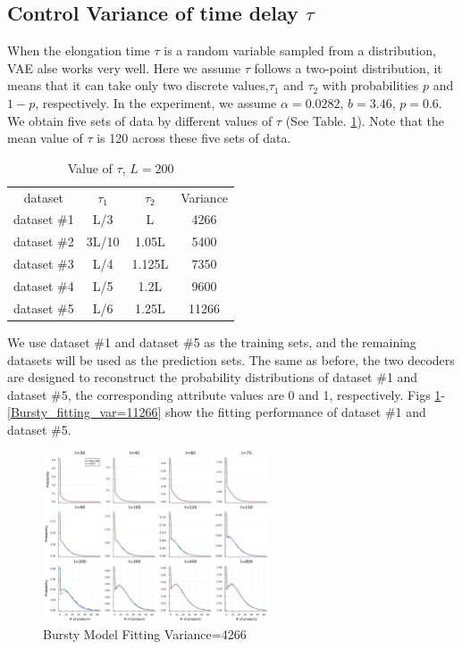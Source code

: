 \documentclass[a4paper,10pt]{article}
\begin{document}
\subsection{Control Variance of time delay $\tau$}
When the elongation time $\tau$ is a random variable sampled from a distribution, VAE alse works very well. Here we assume $\tau$ follows a two-point distribution, it means that it can take only two discrete values,$\tau_1$ and $\tau_2$ with probabilities $p$ and $1-p$, respectively. In the experiment, we assume $\alpha=0.0282$, $b=3.46$, $p=0.6$. We obtain five sets of data by different values of $\tau$ (See Table. \ref{table of tau}). Note that the mean value of $\tau$ is 120 across these five sets of data.
\begin{table}[H]
	\centering
	  \scriptsize
	  \begin{tabular}{c|ccc}
		  \toprule
		  dataset & $\tau_1$ & $\tau_2$ & Variance \\
		  \cmidrule{1-4}
		  dataset \#1 & L/3   & L      & 4266 \\
		  dataset \#2 & 3L/10 & 1.05L  & 5400 \\
		  dataset \#3 & L/4   & 1.125L & 7350 \\
	      dataset \#4 & L/5   & 1.2L   & 9600 \\
	      dataset \#5 & L/6   & 1.25L  & 11266 \\
	  \bottomrule
	  \end{tabular}
	  \caption{Value of $\tau$, $L=200$}
	  \label{table of tau}
\end{table}
We use dataset \#1 and dataset \#5 as the training sets, and the remaining datasets will be used as the prediction sets. The same as before, the two decoders are designed to reconstruct the probability distributions of dataset \#1 and dataset \#5, the corresponding attribute values are 0 and 1, respectively. Figs \ref{Bursty_fitting_var=4266}-\ref{Bursty_fitting_var=11266} show the fitting performance of dataset \#1 and dataset \#5.
\begin{figure}[h]
	\centering
	\includegraphics[width=0.6\textwidth]{Figs/fit_var=4266.pdf}
	\caption{Bursty Model Fitting Variance=4266}\label{Bursty_fitting_var=4266}  
\end{figure}
\end{document}
